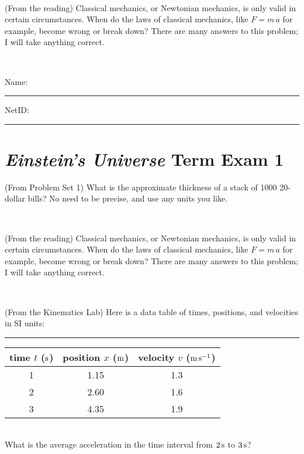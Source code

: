 \documentclass[12pt, letterpaper]{article}
\begin{document}
\vfill ~

\begin{problem} (From the reading)
Classical mechanics, or Newtonian mechanics, is only valid in certain
circumstances. When do the laws of classical mechanics, like $F =
m\,a$ for example, become wrong or break down? There are many answers
to this problem; I will take anything correct.
\end{problem}


\vfill ~


\cleardoublepage



\noindent
Name: \rule[-1ex]{0.60\textwidth}{0.1pt}
NetID: \rule[-1ex]{0.20\textwidth}{0.1pt}

\section*{\textsl{Einstein's Universe} Term Exam 1}
\setcounter{problem}{1}


\begin{problem} (From Problem Set 1)
What is the approximate thickness of a stack of 1000 20-dollar bills?
No need to be precise, and use any units you like.
\end{problem}


\vfill ~

\begin{problem} (From the reading)
Classical mechanics, or Newtonian mechanics, is only valid in certain
circumstances. When do the laws of classical mechanics, like $F =
m\,a$ for example, become wrong or break down? There are many answers
to this problem; I will take anything correct.
\end{problem}


\vfill ~

\begin{problem} (From the Kinematics Lab)
Here is a data table of times, positions, and velocities in SI units:\\
\rule{1.0in}{0pt}\begin{tabular}{c|c|c}
time $t$ ($\mathrm{s}$) & position $x$ ($\mathrm{m}$) & velocity $v$ ($\mathrm{m}\,\mathrm{s}^{-1}$) \\
\hline
1 & 1.15 & 1.3 \\
2 & 2.60 & 1.6 \\
3 & 4.35 & 1.9 \\
\hline
\end{tabular}\\
What is the average acceleration in the time interval from $2\,\mathrm{s}$ to $3\,\mathrm{s}$?
\end{problem}
\end{document}
